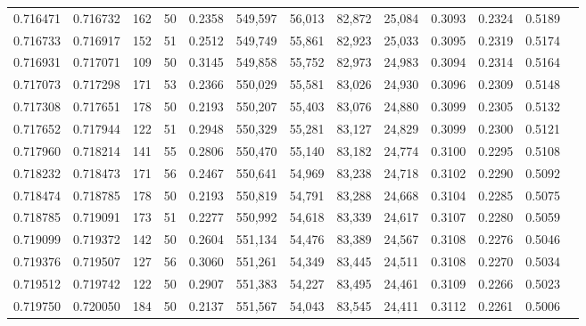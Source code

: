 \begin{tabular}{rrrrrrrrrrrrr}
0.716471 & 0.716732 &   162 &  50 &                                     0.2358 & 549,597 &  56,013 &  82,872 &  25,084 & 0.3093 & 0.2324 & 0.5189 \\
0.716733 & 0.716917 &   152 &  51 &                                     0.2512 & 549,749 &  55,861 &  82,923 &  25,033 & 0.3095 & 0.2319 & 0.5174 \\
0.716931 & 0.717071 &   109 &  50 &                                     0.3145 & 549,858 &  55,752 &  82,973 &  24,983 & 0.3094 & 0.2314 & 0.5164 \\
0.717073 & 0.717298 &   171 &  53 &                                     0.2366 & 550,029 &  55,581 &  83,026 &  24,930 & 0.3096 & 0.2309 & 0.5148 \\
0.717308 & 0.717651 &   178 &  50 &                                     0.2193 & 550,207 &  55,403 &  83,076 &  24,880 & 0.3099 & 0.2305 & 0.5132 \\
0.717652 & 0.717944 &   122 &  51 &                                     0.2948 & 550,329 &  55,281 &  83,127 &  24,829 & 0.3099 & 0.2300 & 0.5121 \\
0.717960 & 0.718214 &   141 &  55 &                                     0.2806 & 550,470 &  55,140 &  83,182 &  24,774 & 0.3100 & 0.2295 & 0.5108 \\
0.718232 & 0.718473 &   171 &  56 &                                     0.2467 & 550,641 &  54,969 &  83,238 &  24,718 & 0.3102 & 0.2290 & 0.5092 \\
0.718474 & 0.718785 &   178 &  50 &                                     0.2193 & 550,819 &  54,791 &  83,288 &  24,668 & 0.3104 & 0.2285 & 0.5075 \\
0.718785 & 0.719091 &   173 &  51 &                                     0.2277 & 550,992 &  54,618 &  83,339 &  24,617 & 0.3107 & 0.2280 & 0.5059 \\
0.719099 & 0.719372 &   142 &  50 &                                     0.2604 & 551,134 &  54,476 &  83,389 &  24,567 & 0.3108 & 0.2276 & 0.5046 \\
0.719376 & 0.719507 &   127 &  56 &                                     0.3060 & 551,261 &  54,349 &  83,445 &  24,511 & 0.3108 & 0.2270 & 0.5034 \\
0.719512 & 0.719742 &   122 &  50 &                                     0.2907 & 551,383 &  54,227 &  83,495 &  24,461 & 0.3109 & 0.2266 & 0.5023 \\
0.719750 & 0.720050 &   184 &  50 &                                     0.2137 & 551,567 &  54,043 &  83,545 &  24,411 & 0.3112 & 0.2261 & 0.5006 \\

\end{tabular}
